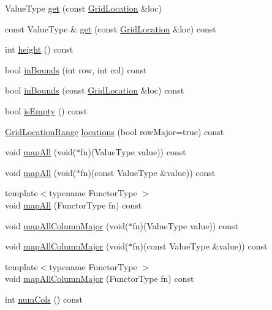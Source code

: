 \begin{DoxyCompactItemize}
\item 
Value\+Type \mbox{\hyperlink{classGrid_a9f9ad65f113e87072ae3b470ba803644}{get}} (const \mbox{\hyperlink{structGridLocation}{Grid\+Location}} \&loc)
\item 
const Value\+Type \& \mbox{\hyperlink{classGrid_ad9a359dc416919242abe643f7677f491}{get}} (const \mbox{\hyperlink{structGridLocation}{Grid\+Location}} \&loc) const
\item 
int \mbox{\hyperlink{classGrid_ad3774f6419003470f54fd495124ef51f}{height}} () const
\item 
bool \mbox{\hyperlink{classGrid_aa0a86249b1e35e3b741f1e19283c298a}{in\+Bounds}} (int row, int col) const
\item 
bool \mbox{\hyperlink{classGrid_a1b7d34c13c853a2ac9bdc084ec1535e9}{in\+Bounds}} (const \mbox{\hyperlink{structGridLocation}{Grid\+Location}} \&loc) const
\item 
bool \mbox{\hyperlink{classGrid_acf82f9b2937375c7b1cf3dccb3df3312}{is\+Empty}} () const
\item 
\mbox{\hyperlink{classGridLocationRange}{Grid\+Location\+Range}} \mbox{\hyperlink{classGrid_af170fd7f5c78f47c0a8c8c5ac937b39b}{locations}} (bool row\+Major=true) const
\item 
void \mbox{\hyperlink{classGrid_a2c1f872cda6af6b5b52fda7107f0f296}{map\+All}} (void($\ast$fn)(Value\+Type value)) const
\item 
void \mbox{\hyperlink{classGrid_a318509926b2642a5234b08ac2021cd0f}{map\+All}} (void($\ast$fn)(const Value\+Type \&value)) const
\item 
{\footnotesize template$<$typename Functor\+Type $>$ }\\void \mbox{\hyperlink{classGrid_a8dc32c1e45704cfae41daf8adb4e66dc}{map\+All}} (Functor\+Type fn) const
\item 
void \mbox{\hyperlink{classGrid_a7a7fe3ed55c6cd56c7e92bd9a6809f5a}{map\+All\+Column\+Major}} (void($\ast$fn)(Value\+Type value)) const
\item 
void \mbox{\hyperlink{classGrid_afbd29192b593bdbee1df7a3fc9016eac}{map\+All\+Column\+Major}} (void($\ast$fn)(const Value\+Type \&value)) const
\item 
{\footnotesize template$<$typename Functor\+Type $>$ }\\void \mbox{\hyperlink{classGrid_a454f81038b640721a24133c79e6ecfc9}{map\+All\+Column\+Major}} (Functor\+Type fn) const
\item 
int \mbox{\hyperlink{classGrid_a5997e103e56aae1db12e1f7f02e136c5}{num\+Cols}} () const
\item 

\end{DoxyCompactItemize}
